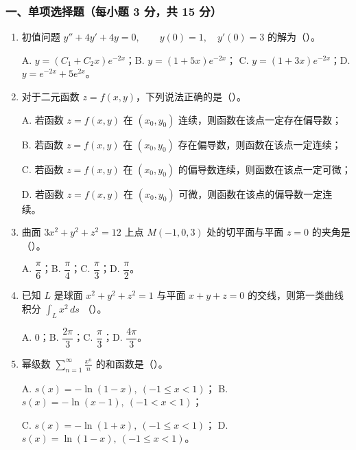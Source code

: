 \subsubsection*{一、单项选择题（每小题 3 分，共 15 分）}
\begin{enumerate}
  \item 初值问题 \(\displaystyle y''+4y'+4y=0,\qquad y(0)=1,\quad y'(0)=3\)
  的解为（\quad）。

  A. $y=(C_1+C_2x)e^{-2x}$；\quad B. $y=(1+5x)e^{-2x}$；\quad
  C. $y=(1+3x)e^{-2x}$；\quad D. $y=e^{-2x}+5e^{2x}$。

  \item 对于二元函数 $z=f(x,y)$，下列说法正确的是（\quad）。

  A. 若函数 $z=f(x,y)$ 在 $(x_0,y_0)$ 连续，则函数在该点一定存在偏导数；

  B. 若函数 $z=f(x,y)$ 在 $(x_0,y_0)$ 存在偏导数，则函数在该点一定连续；

  C. 若函数 $z=f(x,y)$ 在 $(x_0,y_0)$ 的偏导数连续，则函数在该点一定可微；

  D. 若函数 $z=f(x,y)$ 在 $(x_0,y_0)$ 可微，则函数在该点的偏导数一定连续。

  \item 曲面 \(\displaystyle 3x^2+y^2+z^2=12\)
  上点 $M(-1,0,3)$ 处的切平面与平面 $z=0$ 的夹角是（\quad）。

  A. $\dfrac{\pi}{6}$；\quad B. $\dfrac{\pi}{4}$；\quad C. $\dfrac{\pi}{3}$；\quad D. $\dfrac{\pi}{2}$。

  \item 已知 $L$ 是球面 \(\displaystyle x^2+y^2+z^2=1\)
  与平面 $x+y+z=0$ 的交线，则第一类曲线积分 \(\displaystyle \int_Lx^2\,ds\)
  （\quad）。

  A. $0$；\quad B. $\dfrac{2\pi}{3}$；\quad C. $\dfrac{\pi}{3}$；\quad D. $\dfrac{4\pi}{3}$。

  \item 幂级数 \(\displaystyle \sum_{n=1}^{\infty}\frac{x^n}{n}\)
  的和函数是（\quad）。

  A. $s(x)=-\ln(1-x),\ (-1\le x<1)$；\quad
  B. $s(x)=-\ln(x-1),\ (-1<x<1)$；

  C. $s(x)=-\ln(1+x),\ (-1\le x<1)$；\quad
  D. $s(x)=\ln(1-x),\ (-1\le x<1)$。
\end{enumerate}

